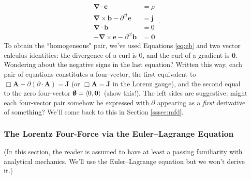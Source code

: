 \documentclass[12pt]{article}
\renewcommand{\vv}[1]{\mathbf{#1}}
\newcommand{\del}{\boldsymbol{\nabla}}
\begin{document}
\begin{equation}\label{eq:me}
\boxed{
\begin{aligned}
\del \cdot \vv e &= \rho \\
\del \times \vv b - \partial^{ct} \vv e &= \vv j \\ 
\del \cdot \vv b &= 0 \\
- \del \times \vv e - \partial^{ct} \vv b &= \vv 0
\end{aligned}
} \, .
\end{equation}
To obtain the ``homogeneous" pair, we've used Equations \ref{eq:eb} and two vector calculus identities: the divergence of a curl is $0$, and the curl of a gradient is $\vv 0$. Wondering about the negative signs in the last equation? Written this way, each pair of equations constitutes a four-vector, the first equivalent to $\Box \vv A - \partialup ( \partialup \cdot \vv A) = \vv J$ (or $\Box \vv A = \vv J$ in the Lorenz gauge), and the second equal to the zero four-vector $\textrm{\mbox{\boldmath $\emptyset$}} = \langle 0, \vv 0 \rangle$ (show this!). The left sides are suggestive; might each four-vector pair somehow be expressed with $\partialup$ appearing as a \emph{first} derivative of something? We'll come back to this in Section \ref{sssec:mfd}.


\subsubsection{The Lorentz Four-Force via the Euler--Lagrange Equation}\label{sssec:ele}

(In this section, the reader is assumed to have at least a passing familiarity with analytical mechanics. We'll use the Euler--Lagrange equation but we won't derive it.)
\end{document}

